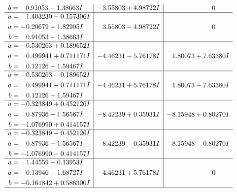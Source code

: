 \documentclass[1p]{elsarticle_modified}
\theoremstyle{definition}
\begin{document}
$$\begin{array}{c|c|c}
\begin{aligned}
b &= \phantom{-}0.91053 - 1.38663 I\end{aligned}
 & \phantom{-}3.55803 + 4.98722 I & \phantom{-0.000000 } 0 \\ \hline\begin{aligned}
u &= \phantom{-}1.403230 - 0.157306 I \\
a &= -0.20679 - 1.82905 I \\
b &= \phantom{-}0.91053 + 1.38663 I\end{aligned}
 & \phantom{-}3.55803 - 4.98722 I & \phantom{-0.000000 } 0 \\ \hline\begin{aligned}
u &= -0.530263 + 0.189652 I \\
a &= \phantom{-}0.499941 + 0.711171 I \\
b &= \phantom{-}0.12126 - 1.59467 I\end{aligned}
 & -4.46231 - 5.76178 I & \phantom{-}1.80073 + 7.63380 I \\ \hline\begin{aligned}
u &= -0.530263 - 0.189652 I \\
a &= \phantom{-}0.499941 - 0.711171 I \\
b &= \phantom{-}0.12126 + 1.59467 I\end{aligned}
 & -4.46231 + 5.76178 I & \phantom{-}1.80073 - 7.63380 I \\ \hline\begin{aligned}
u &= -0.323849 + 0.452126 I \\
a &= \phantom{-}0.87936 + 1.56567 I \\
b &= -1.076990 + 0.414157 I\end{aligned}
 & -8.42239 + 0.35931 I & -8.15948 + 0.80270 I \\ \hline\begin{aligned}
u &= -0.323849 - 0.452126 I \\
a &= \phantom{-}0.87936 - 1.56567 I \\
b &= -1.076990 - 0.414157 I\end{aligned}
 & -8.42239 - 0.35931 I & -8.15948 - 0.80270 I \\ \hline\begin{aligned}
u &= \phantom{-}1.44559 + 0.13953 I \\
a &= \phantom{-}0.13946 - 1.68727 I \\
b &= -0.161842 + 0.586300 I\end{aligned}
 & \phantom{-}4.46231 + 5.76178 I & \phantom{-0.000000 } 0\\
 \hline 
 \end{array}$$\newpage$$\begin{array}{c|c|c}  

\end{array}$$
\end{document}
